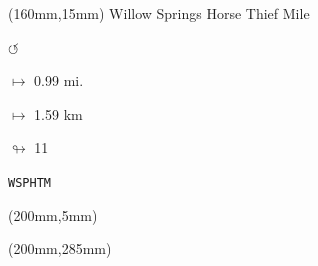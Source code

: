 \begin{textblock*}{40mm}(160mm,15mm)%
Willow Springs Horse Thief Mile
\par \Huge$\circlearrowleft$
\Large
\par$\mapsto$ 0.99 mi.
\par$\mapsto$ 1.59 km
\par$\looparrowright$ 11
\par\hfill\tiny\tt WSPHTM\\
\end{textblock*}
\begin{textblock*}{20mm}(200mm,5mm)%
\fbox{\thepage}
\end{textblock*}
\begin{textblock*}{20mm}(200mm,285mm)%
\fbox{\thepage}
\end{textblock*}
\null\newpage

